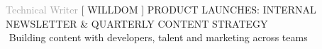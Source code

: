 \begin{cvtable}
{\textcolor{darkgray}{%
    Technical Writer
    }}%
{[ {W\scriptsize ILL}{D\scriptsize OM} ]}%
{%
{\scriptsize PRODUCT LAUNCHES:
INTERNAL NEWSLETTER \& QUARTERLY CONTENT STRATEGY
} \\
    \textperiodcentered $ $ Building content with developers, talent and marketing across teams 
} 


\end{cvtable}

